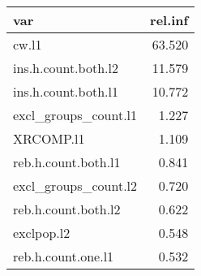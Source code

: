 \begin{tabular}{lr}
  \hline
var & rel.inf \\ 
  \hline
cw.l1 & 63.520 \\ 
  ins.h.count.both.l2 & 11.579 \\ 
  ins.h.count.both.l1 & 10.772 \\ 
  excl\_groups\_count.l1 & 1.227 \\ 
  XRCOMP.l1 & 1.109 \\ 
  reb.h.count.both.l1 & 0.841 \\ 
  excl\_groups\_count.l2 & 0.720 \\ 
  reb.h.count.both.l2 & 0.622 \\ 
  exclpop.l2 & 0.548 \\ 
  reb.h.count.one.l1 & 0.532 \\ 
   \hline
\end{tabular}

